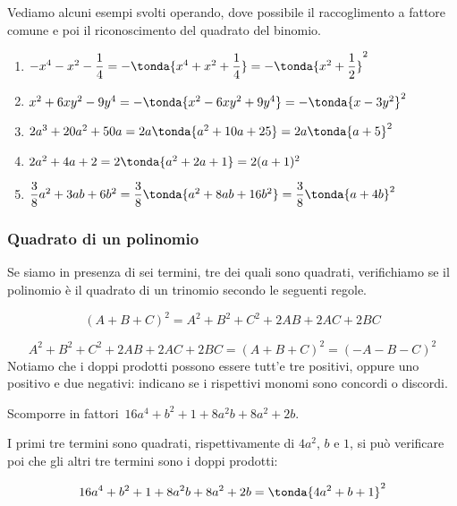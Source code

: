 \begin{esempio}{}{}
Vediamo alcuni esempi svolti operando, dove possibile il raccoglimento a 
fattore comune e poi il riconoscimento del quadrato del binomio.

\vspace{-.5em}
\begin{enumerate}
\item 
\(-x^4-x^2-\dfrac{1}{4}=-\tonda{x^4+x^2+\dfrac{1}{4}}=
  -\tonda{x^2+\dfrac{1}{2}}^{2}\)
\item 
\(x^2+6xy^{2}-9y^{4}=-\tonda{x^2-6xy^{2}+9y^{4}}=
  -\tonda{x-3y^{2}}^{2}\)
\item 
\(2a^{3}+20a^{2}+50a=2a\tonda{a^{2}+10a+25}=2a\tonda{a+5}^{2}\)
\item 
\(2a^{2}+4a+2=2\tonda{a^{2}+2a+1}=2(a+1)^{2}\)
\item 
\(\dfrac{3}{8}a^{2}+3ab+6b^{2}=
  \dfrac{3}{8}\tonda{a^{2}+8ab+16b^{2} }=
  \dfrac{3}{8}\tonda{a+4b}^{2}\)
\end{enumerate}
\end{esempio}


\subsubsection{Quadrato di un polinomio}
\label{subsubsec:divpol_quadpol}

Se siamo in presenza di sei termini, tre dei quali sono quadrati, 
verifichiamo se il polinomio è il quadrato di un trinomio secondo le 
seguenti regole.

\begin{equation*}
(A+B+C)^{2}=A^{2}+B^{2}+C^{2}+2AB+2AC+2BC
\end{equation*}

\vspace{-2.0em}
\begin{equation*}
A^{2}+B^{2}+C^{2}+2AB+2AC+2BC=(A+B+C)^{2}=(-A-B-C)^{2}
\end{equation*}
Notiamo che i doppi prodotti possono essere tutt'e tre positivi, oppure uno 
positivo e due negativi: indicano se i rispettivi monomi sono concordi o 
discordi.

\begin{esempio}{}{}
Scomporre in fattori~\(16a^{4}+b^{2}+1+8a^{2}b+8a^{2}+2b\).

I primi tre termini sono quadrati, rispettivamente di \(4a^{2}\), \(b\) 
e \(1\), si può verificare poi che gli altri tre termini sono i doppi 
prodotti:

\vspace{-1.0em}
\[16a^{4}+b^{2}+1+8a^{2}b+8a^{2}+2b=\tonda{4a^{2}+b+1}^{2}\]
\end{esempio}

